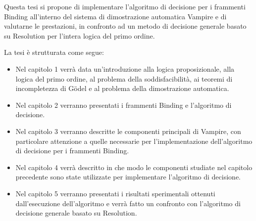 \documentclass[./main.tex]{subfiles}
\begin{document}
Questa tesi si propone di implementare l'algoritmo di decisione per i frammenti Binding
all'interno del sistema di dimostrazione automatica Vampire 
e di valutarne le prestazioni, in confronto ad un metodo di decisione generale
basato su Resolution per l'intera logica del primo ordine.

% 

La tesi è strutturata come segue:
\begin{itemize}
    \item Nel capitolo 1 verrà data un'introduzione 
    alla logica proposizionale, alla logica del primo ordine, al problema della soddisfacibilità,
    ai teoremi di incompletezza di Gödel e al problema della dimostrazione automatica.
    \item Nel capitolo 2 verranno presentati i frammenti Binding e l'algoritmo di decisione.
    \item Nel capitolo 3 verranno descritte le componenti principali di Vampire, con particolare attenzione
    a quelle necessarie per l'implementazione dell'algoritmo di decisione per i frammenti Binding.
    \item Nel capitolo 4 verrà descritto in che modo le componenti studiate nel capitolo precedente
    sono state utilizzate per implementare l'algoritmo di decisione.
    \item Nel capitolo 5 verranno presentati i risultati sperimentali ottenuti dall'esecuzione dell'algoritmo
    e verrà fatto un confronto con l'algoritmo di decisione generale basato su Resolution.
\end{itemize}
\end{document}
